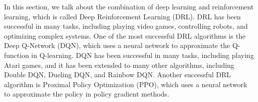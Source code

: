 In this section, we talk about the combination of deep learning and reinforcement learning, which is called Deep Reinforcement Learning (DRL).
DRL has been successful in many tasks, including playing video games, controlling robots, and optimizing complex systems.
One of the most successful DRL algorithms is the Deep Q-Network (DQN), which uses a neural network to approximate the Q-function in Q-learning.
DQN has been successful in many tasks, including playing Atari games, and it has been extended to many other algorithms, including Double DQN, Dueling DQN, and Rainbow DQN.
Another successful DRL algorithm is Proximal Policy Optimization (PPO), which uses a neural network to approximate the policy in policy gradient methods.
